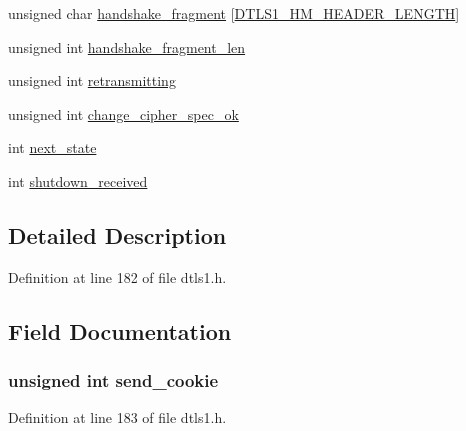 \begin{DoxyCompactItemize}
\item 
unsigned char \hyperlink{structdtls1__state__st_a434f29ae735bb2efecc7132d718fa1c1}{handshake\+\_\+fragment} \mbox{[}\hyperlink{ssl_2dtls1_8h_a313ba59cb24cf778204cfff800bebc4c}{D\+T\+L\+S1\+\_\+\+H\+M\+\_\+\+H\+E\+A\+D\+E\+R\+\_\+\+L\+E\+N\+G\+TH}\mbox{]}
\item 
unsigned int \hyperlink{structdtls1__state__st_a810b0f6ab3d1979beb8c3a45cfc21987}{handshake\+\_\+fragment\+\_\+len}
\item 
unsigned int \hyperlink{structdtls1__state__st_a3bbb053e9a3d604e84db3933a7999b4e}{retransmitting}
\item 
unsigned int \hyperlink{structdtls1__state__st_a5b07271dda2c4c89220266017cecddc1}{change\+\_\+cipher\+\_\+spec\+\_\+ok}
\item 
int \hyperlink{structdtls1__state__st_ac0c302bc97f010b7f5965faa07b00354}{next\+\_\+state}
\item 
int \hyperlink{structdtls1__state__st_a27ee0ed9ce27010981b9513e1ee71458}{shutdown\+\_\+received}
\end{DoxyCompactItemize}


\subsection{Detailed Description}


Definition at line 182 of file dtls1.\+h.



\subsection{Field Documentation}
\subsubsection[{\texorpdfstring{send\+\_\+cookie}{send_cookie}}]{\setlength{\rightskip}{0pt plus 5cm}unsigned int send\+\_\+cookie}\hypertarget{structdtls1__state__st_a4fa0086728c4e03c5d639277623600c6}{}\label{structdtls1__state__st_a4fa0086728c4e03c5d639277623600c6}


Definition at line 183 of file dtls1.\+h.

